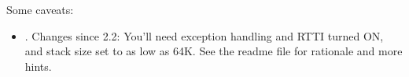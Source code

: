 Some caveats:

\begin{itemize}

 \item {}. Changes since {\opp} 2.2:
   You'll need exception handling and RTTI turned ON, and
   stack size set to as low as 64K.
   See the readme file for rationale and more hints.

\end{itemize}



